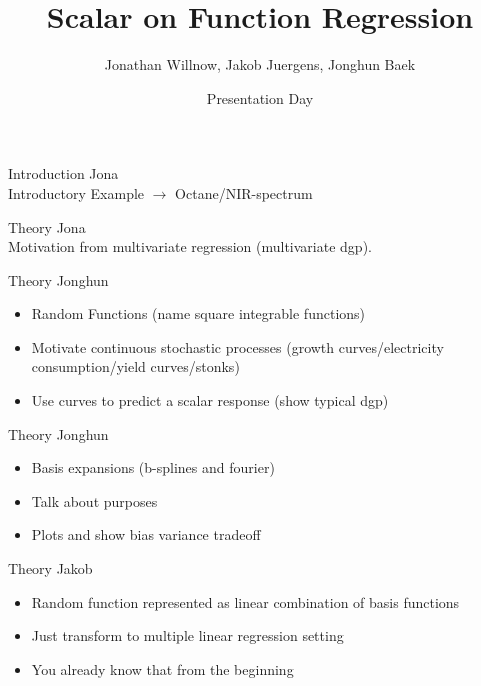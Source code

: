 \documentclass{beamer}
\title{Scalar on Function Regression}
\author{Jonathan Willnow, Jakob Juergens, Jonghun Baek}
\date{{\color{red}}Presentation Day}
\begin{document}
	
	\begin{frame}
		\titlepage 
	\end{frame}
	
	\logo{}
	
	
	\begin{frame}{Introduction}
		Jona \\
		Introductory Example $\rightarrow$ Octane/NIR-spectrum
	\end{frame}
	
	\begin{frame}{Theory}
		Jona \\
		Motivation from multivariate regression (multivariate dgp).
	\end{frame}

	\begin{frame}{Theory}
		Jonghun
		\begin{itemize}
			\item Random Functions (name square integrable functions)
			\item Motivate continuous stochastic processes (growth curves/electricity consumption/yield curves/stonks)
			\item Use curves to predict a scalar response (show typical dgp)
		\end{itemize}
	\end{frame}

	\begin{frame}{Theory}
		Jonghun
		\begin{itemize}
			\item Basis expansions (b-splines and fourier)
			\item Talk about purposes
			\item Plots and show bias variance tradeoff
		\end{itemize}
	\end{frame}

	\begin{frame}{Theory}
		Jakob
		\begin{itemize}
			\item Random function represented as linear combination of basis functions
			\item Just transform to multiple linear regression setting
			\item You already know that from the beginning
		\end{itemize}
	\end{frame}
\end{document}
